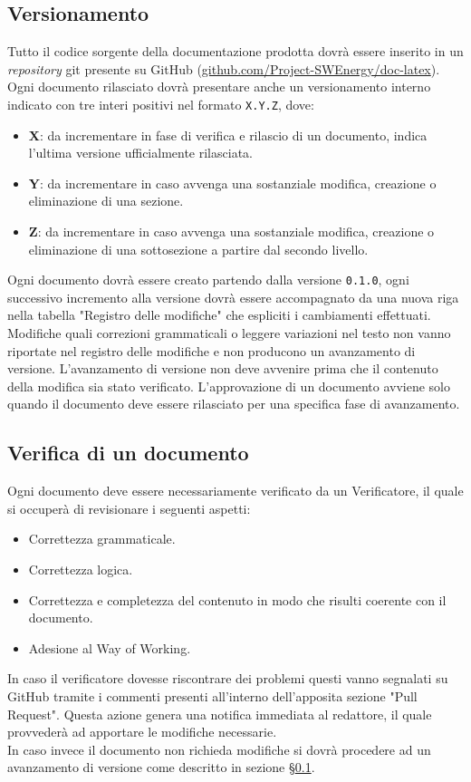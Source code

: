 \subsection{Versionamento}
\label{documentazione_versionamento}
Tutto il codice sorgente della documentazione prodotta dovrà essere inserito in un \textit{repository} git presente su GitHub (\href{https://github.com/Project-SWEnergy/doc-latex/}{github.com/Project-SWEnergy/doc-latex}).\\ 
Ogni documento rilasciato dovrà presentare anche un versionamento interno indicato con tre interi positivi nel formato \texttt{X.Y.Z}, dove:
\begin{itemize}
    \item \textbf{X}: da incrementare in fase di verifica e rilascio di un documento, indica l'ultima versione ufficialmente rilasciata.
    \item \textbf{Y}: da incrementare in caso avvenga una sostanziale modifica, creazione o eliminazione di una sezione.
    \item \textbf{Z}: da incrementare in caso avvenga una sostanziale modifica, creazione o eliminazione di una sottosezione a partire dal secondo livello.
\end{itemize}
Ogni documento dovrà essere creato partendo dalla versione \texttt{0.1.0}, ogni successivo incremento alla versione dovrà essere accompagnato da una nuova riga nella tabella "Registro delle modifiche" che espliciti i cambiamenti effettuati.
Modifiche quali correzioni grammaticali o leggere variazioni nel testo non vanno riportate nel registro delle modifiche e non producono un avanzamento di versione.
L'avanzamento di versione non deve avvenire prima che il contenuto della modifica sia stato verificato.
L'approvazione di un documento avviene solo quando il documento deve essere rilasciato per una specifica fase di avanzamento.

\subsection{Verifica di un documento}
Ogni documento deve essere necessariamente verificato da un Verificatore, il quale si occuperà di revisionare i seguenti aspetti:
\begin{itemize}
    \item Correttezza grammaticale.
    \item Correttezza logica.
    \item Correttezza e completezza del contenuto in modo che risulti coerente con il documento.
    \item Adesione al Way of Working.
\end{itemize}
\noindent
In caso il verificatore dovesse riscontrare dei problemi questi vanno segnalati su GitHub tramite i commenti presenti all'interno dell'apposita sezione "Pull Request".
Questa azione genera una notifica immediata al redattore, il quale provvederà ad apportare le modifiche necessarie. \\
In caso invece il documento non richieda modifiche si dovrà procedere ad un avanzamento di versione come descritto in sezione \S\ref{documentazione_versionamento}.


